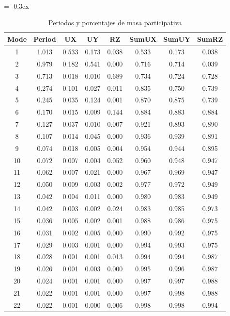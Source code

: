 \documentclass{article}%
\begin{document}
\begin{table}[H]%
\extrarowheight = -0.3ex%
\renewcommand{\arraystretch}{1.3}%
\centering%
\caption{Periodos y porcentajes de masa participativa}%
\begin{tabular}{cccccccc}
\toprule
Mode & Period & UX & UY & RZ & SumUX & SumUY & SumRZ \\
\midrule
1 & 1.013 & 0.533 & 0.173 & 0.038 & 0.533 & 0.173 & 0.038 \\
2 & 0.979 & 0.182 & 0.541 & 0.000 & 0.716 & 0.714 & 0.039 \\
3 & 0.713 & 0.018 & 0.010 & 0.689 & 0.734 & 0.724 & 0.728 \\
4 & 0.274 & 0.101 & 0.027 & 0.011 & 0.835 & 0.750 & 0.739 \\
5 & 0.245 & 0.035 & 0.124 & 0.001 & 0.870 & 0.875 & 0.739 \\
6 & 0.170 & 0.015 & 0.009 & 0.144 & 0.884 & 0.883 & 0.884 \\
7 & 0.127 & 0.037 & 0.010 & 0.007 & 0.921 & 0.893 & 0.890 \\
8 & 0.107 & 0.014 & 0.045 & 0.000 & 0.936 & 0.939 & 0.891 \\
9 & 0.074 & 0.018 & 0.005 & 0.004 & 0.954 & 0.944 & 0.895 \\
10 & 0.072 & 0.007 & 0.004 & 0.052 & 0.960 & 0.948 & 0.947 \\
11 & 0.062 & 0.007 & 0.021 & 0.000 & 0.967 & 0.969 & 0.947 \\
12 & 0.050 & 0.009 & 0.003 & 0.002 & 0.977 & 0.972 & 0.949 \\
13 & 0.042 & 0.004 & 0.011 & 0.000 & 0.980 & 0.983 & 0.949 \\
14 & 0.042 & 0.003 & 0.002 & 0.024 & 0.983 & 0.985 & 0.973 \\
15 & 0.036 & 0.005 & 0.002 & 0.001 & 0.988 & 0.986 & 0.975 \\
16 & 0.031 & 0.002 & 0.005 & 0.000 & 0.990 & 0.992 & 0.975 \\
17 & 0.029 & 0.003 & 0.001 & 0.000 & 0.994 & 0.993 & 0.975 \\
18 & 0.028 & 0.001 & 0.001 & 0.013 & 0.994 & 0.994 & 0.987 \\
19 & 0.026 & 0.001 & 0.003 & 0.000 & 0.995 & 0.996 & 0.987 \\
20 & 0.024 & 0.001 & 0.001 & 0.000 & 0.997 & 0.997 & 0.988 \\
21 & 0.022 & 0.001 & 0.001 & 0.000 & 0.997 & 0.998 & 0.988 \\
22 & 0.022 & 0.001 & 0.000 & 0.006 & 0.998 & 0.998 & 0.994 \\

\end{tabular}
\end{table}
\end{document}

